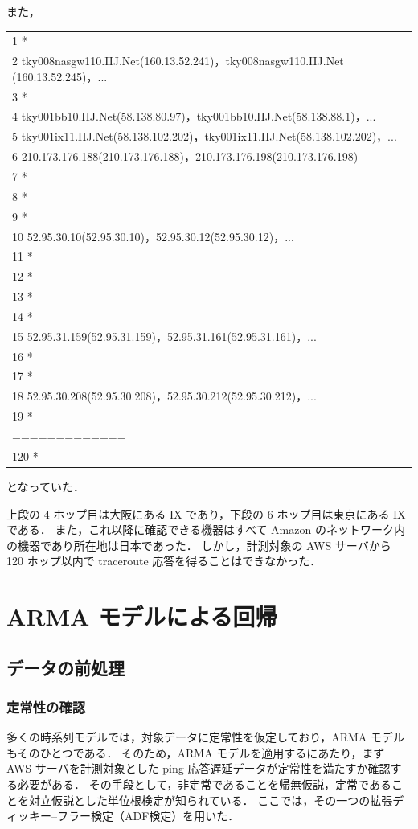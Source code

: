 \documentclass[a4j]{jarticle}
\begin{document}
また，

\begin{table}[H]
\begin{tabular}{l}
 1  *\\
 2  tky008nasgw110.IIJ.Net(160.13.52.241)，tky008nasgw110.IIJ.Net (160.13.52.245)，...\\
 3  *\\
 4  tky001bb10.IIJ.Net(58.138.80.97)，tky001bb10.IIJ.Net(58.138.88.1)，...\\
 5  tky001ix11.IIJ.Net(58.138.102.202)，tky001ix11.IIJ.Net(58.138.102.202)，...\\
 6  210.173.176.188(210.173.176.188)，210.173.176.198(210.173.176.198)\\
 7  *\\
 8  *\\
 9  *\\
10  52.95.30.10(52.95.30.10)，52.95.30.12(52.95.30.12)，...\\
11  *\\
12  *\\
13  *\\
14  *\\
15  52.95.31.159(52.95.31.159)，52.95.31.161(52.95.31.161)，...\\
16  *\\
17  *\\
18  52.95.30.208(52.95.30.208)，52.95.30.212(52.95.30.212)，...\\
19  *\\
=============\\
120  *\\
\end{tabular}
\end{table}
となっていた．

上段の 4 ホップ目は大阪にある IX であり，下段の 6 ホップ目は東京にある IX である．
また，これ以降に確認できる機器はすべて Amazon のネットワーク内の機器であり所在地は日本であった．
しかし，計測対象の AWS サーバから 120 ホップ以内で traceroute 応答を得ることはできなかった．
\section{ARMA モデルによる回帰}
\subsection{データの前処理}
\subsubsection{定常性の確認}
多くの時系列モデルでは，対象データに定常性を仮定しており，ARMA モデルもそのひとつである．
そのため，ARMA モデルを適用するにあたり，まず AWS サーバを計測対象とした ping 応答遅延データが定常性を満たすか確認する必要がある．
その手段として，非定常であることを帰無仮説，定常であることを対立仮説とした単位根検定が知られている．
ここでは，その一つの拡張ディッキー–フラー検定（ADF検定）を用いた．
\end{document}
